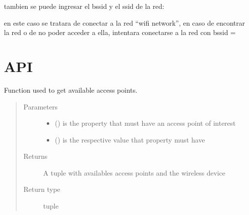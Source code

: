 \documentclass[letterpaper,10pt,english]{sphinxhowto}
\begin{document}
tambien se puede ingresar el bssid y el ssid de la red:

\begin{sphinxVerbatim}[commandchars=\\\{\}]
 
\end{sphinxVerbatim}

en este caso se tratara de conectar a la red “wifi network”, en caso de encontrar
la red o de no poder acceder a ella, intentara conectarse a la red con bssid = 


\chapter{API}
\label{\detokenize{index:module-nm_dbus_python}}\label{\detokenize{index:api}}

\begin{fulllineitems}
\label{\detokenize{index:nm_dbus_python.accessPoints}}
Function used to get available access points.
\begin{quote}\begin{description}
\item[{Parameters}] \leavevmode\begin{itemize}
\item {} 
 () \textendash{} is the property that must have an access point of interest

\item {} 
 () \textendash{} is the respective value that property must have

\end{itemize}

\item[{Returns}] \leavevmode
A tuple with availables access points and the wireless device

\item[{Return type}] \leavevmode
tuple

\end{description}\end{quote}

\end{fulllineitems}
\end{document}

